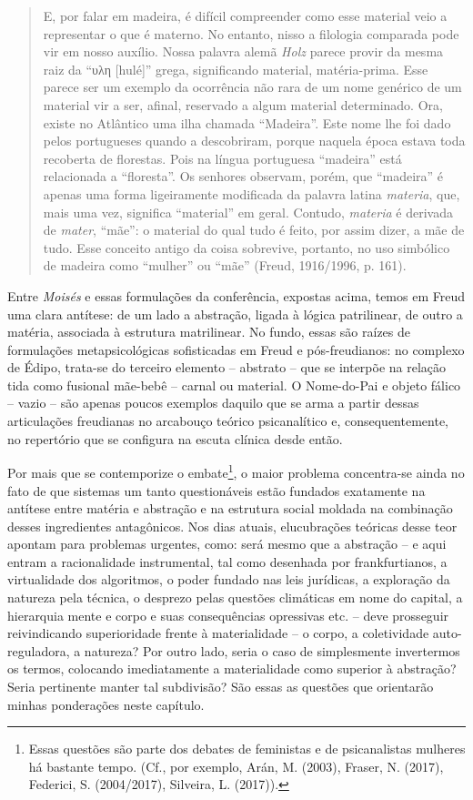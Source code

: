 \begin{quote}
E, por falar em madeira, é difícil compreender como esse material veio a
representar o que é materno. No entanto, nisso a filologia comparada
pode vir em nosso auxílio. Nossa palavra alemã \emph{Holz} parece provir
da mesma raiz da ``υλη {[}hulé{]}'' grega, significando material,
matéria-prima. Esse parece ser um exemplo da ocorrência não rara de um
nome genérico de um material vir a ser, afinal, reservado a algum
material determinado. Ora, existe no Atlântico uma ilha chamada
``Madeira''. Este nome lhe foi dado pelos portugueses quando a
descobriram, porque naquela época estava toda recoberta de florestas.
Pois na língua portuguesa ``madeira'' está relacionada a ``floresta''.
Os senhores observam, porém, que ``madeira'' é apenas uma forma
ligeiramente modificada da palavra latina \emph{materia}, que, mais uma
vez, significa ``material'' em geral. Contudo, \emph{materia} é derivada
de \emph{mater}, ``mãe'': o material do qual tudo é feito, por assim
dizer, a mãe de tudo. Esse conceito antigo da coisa sobrevive, portanto,
no uso simbólico de madeira como ``mulher'' ou ``mãe'' (Freud,
1916/1996, p. 161).
\end{quote}

Entre \emph{Moisés} e essas formulações da conferência, expostas acima,
temos em Freud uma clara antítese: de um lado a abstração, ligada à
lógica patrilinear, de outro a matéria, associada à estrutura
matrilinear. No fundo, essas são raízes de formulações metapsicológicas
sofisticadas em Freud e pós-freudianos: no complexo de Édipo, trata-se
do terceiro elemento -- abstrato -- que se interpõe na relação tida como
fusional mãe-bebê -- carnal ou material. O Nome-do-Pai e objeto fálico
-- vazio -- são apenas poucos exemplos daquilo que se arma a partir
dessas articulações freudianas no arcabouço teórico psicanalítico e,
consequentemente, no repertório que se configura na escuta clínica desde
então.

Por mais que se contemporize o embate\footnote{Essas questões são parte
  dos debates de feministas e de psicanalistas mulheres há bastante
  tempo. (Cf., por exemplo, Arán, M. (2003), Fraser, N. (2017),
  Federici, S. (2004/2017), Silveira, L. (2017)).}, o maior problema
concentra-se ainda no fato de que sistemas um tanto questionáveis estão
fundados exatamente na antítese entre matéria e abstração e na estrutura
social moldada na combinação desses ingredientes antagônicos. Nos dias
atuais, elucubrações teóricas desse teor apontam para problemas
urgentes, como: será mesmo que a abstração -- e aqui entram a
racionalidade instrumental, tal como desenhada por frankfurtianos, a
virtualidade dos algoritmos, o poder fundado nas leis jurídicas, a
exploração da natureza pela técnica, o desprezo pelas questões
climáticas em nome do capital, a hierarquia mente e corpo e suas
consequências opressivas etc. -- deve prosseguir reivindicando
superioridade frente à materialidade -- o corpo, a coletividade
auto-reguladora, a natureza? Por outro lado, seria o caso de
simplesmente invertermos os termos, colocando imediatamente a
materialidade como superior à abstração? Seria pertinente manter tal
subdivisão? São essas as questões que orientarão minhas ponderações
neste capítulo.

